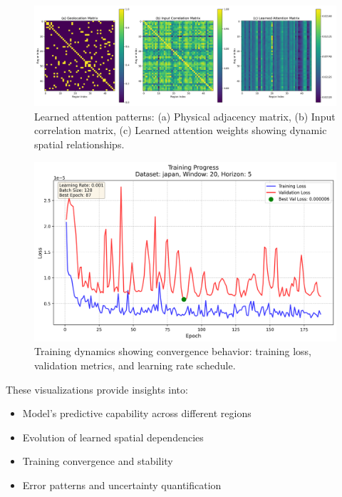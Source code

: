 \documentclass[lettersize, journal]{IEEEtran}
\begin{document}
\begin{figure}[htbp]
    \centering
    \includegraphics[width=\textwidth]{../figures/matrices_japan.w-20.h-5.png}
    \caption{Learned attention patterns: (a) Physical adjacency matrix, (b) Input correlation matrix, (c) Learned attention weights showing dynamic spatial relationships.}
    \label{fig:attention_vis}
\end{figure}

\begin{figure}[htbp]
    \centering
    \includegraphics[width=\columnwidth]{../figures/loss_curve_japan.w-20.h-5.png}
    \caption{Training dynamics showing convergence behavior: training loss, validation metrics, and learning rate schedule.}
    \label{fig:training_curves}
\end{figure}

These visualizations provide insights into:
\begin{itemize}
    \item Model's predictive capability across different regions
    \item Evolution of learned spatial dependencies
    \item Training convergence and stability
    \item Error patterns and uncertainty quantification
\end{itemize}
\end{document}
